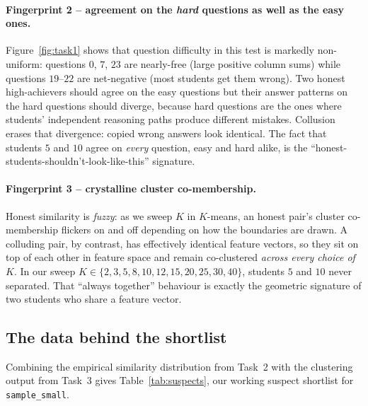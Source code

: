 \documentclass[11pt,a4paper]{article}
\begin{document}
\paragraph{Fingerprint 2 -- agreement on the \emph{hard} questions as
well as the easy ones.} Figure~\ref{fig:task1} shows that question
difficulty in this test is markedly non-uniform: questions $0$, $7$,
$23$ are nearly-free (large positive column sums) while questions
$19$--$22$ are net-negative (most students get them wrong). Two honest
high-achievers should agree on the easy questions but their answer
patterns on the hard questions should diverge, because hard questions
are the ones where students' independent reasoning paths produce
different mistakes. Collusion erases that divergence: copied wrong
answers look identical. The fact that students $5$ and $10$ agree on
\emph{every} question, easy and hard alike, is the
``honest-students-shouldn't-look-like-this'' signature.

\paragraph{Fingerprint 3 -- crystalline cluster co-membership.} Honest
similarity is \emph{fuzzy}: as we sweep $K$ in $K$-means, an honest
pair's cluster co-membership flickers on and off depending on how the
boundaries are drawn. A colluding pair, by contrast, has effectively
identical feature vectors, so they sit on top of each other in feature
space and remain co-clustered \emph{across every choice of $K$}. In
our sweep $K \in \{2,3,5,8,10,12,15,20,25,30,40\}$, students $5$ and
$10$ never separated. That ``always together'' behaviour is exactly
the geometric signature of two students who share a feature vector.

\subsection{The data behind the shortlist}
Combining the empirical similarity distribution from Task~2 with the
clustering output from Task~3 gives Table~\ref{tab:suspects}, our
working suspect shortlist for \texttt{sample\_small}.
\end{document}
